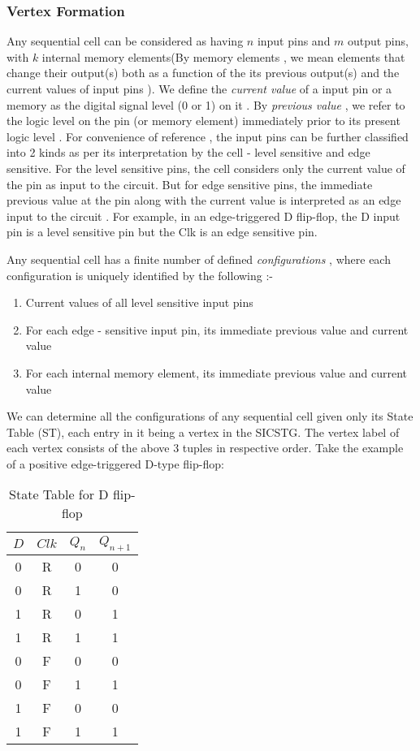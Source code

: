 \documentclass[final]{ieee}
\begin{document}
\subsubsection{Vertex Formation}
\label{vertex_defn}
Any sequential cell can be considered as having $n$ input pins and $m$ output pins, with $k$ internal memory elements(By memory elements , we mean elements that change their output(s) both as a function of the its previous output(s) and the current values of input pins ). We define the \textit{current value} of a input pin or a memory as the digital signal level (0 or 1) on it . By \textit{previous value} , we refer to the logic level on the pin (or memory element) immediately prior to its present logic level . For convenience of reference , the input pins can be further classified into 2 kinds as per its interpretation by the cell - level sensitive and edge sensitive. For the level sensitive pins, the cell considers only the current value of the pin as input to the circuit. But for edge sensitive pins, the immediate previous value at the pin along with the current value is interpreted as an edge input to the circuit . For example, in an edge-triggered D flip-flop, the D input pin is a level sensitive pin but the Clk is an edge sensitive pin.

Any sequential cell has a finite number of defined {\it configurations }, where each configuration is uniquely identified by the following :-
\begin{enumerate}
\item Current values of all level sensitive input pins
\item For each edge - sensitive input pin, its immediate previous value and current value
\item For each internal memory element, its immediate previous value and current value 
\end{enumerate}

We can determine all the configurations of any sequential cell given only its State Table (ST),  each entry in it being a vertex in the SICSTG. The vertex label of each vertex consists of the above 3 tuples in respective order. Take the example of a positive edge-triggered D-type flip-flop:

\begin{table}
\begin{center}
\begin{tabular}{|c|c|c|c|} \hline
$D$ & $Clk$ & $Q_{n}$ & $Q_{n+1}$ \\ \hline
0   &   R   &    0    & 0 \\
0   &   R   &    1    & 0 \\
1   &   R   &    0    & 1 \\
1   &   R   &    1    & 1 \\
0   &   F   &    0    & 0 \\
0   &   F   &    1    & 1 \\
1   &   F   &    0    & 0 \\
1   &   F   &    1    & 1 \\ \hline
\end{tabular}
\caption{State Table for D flip-flop} \label{dffq}
\end{center}
\end{table}
\end{document}
